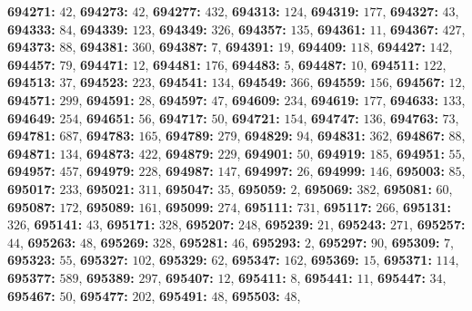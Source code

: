 \textsf{\bfseries 694271:} $42$, \textsf{\bfseries 694273:} $42$, \textsf{\bfseries 694277:} $432$, \textsf{\bfseries 694313:} $124$, \textsf{\bfseries 694319:} $177$, \textsf{\bfseries 694327:} $43$, \textsf{\bfseries 694333:} $84$, \textsf{\bfseries 694339:} $123$, \textsf{\bfseries 694349:} $326$, \textsf{\bfseries 694357:} $135$, \textsf{\bfseries 694361:} $11$, \textsf{\bfseries 694367:} $427$, \textsf{\bfseries 694373:} $88$, \textsf{\bfseries 694381:} $360$, \textsf{\bfseries 694387:} $7$, \textsf{\bfseries 694391:} $19$, \textsf{\bfseries 694409:} $118$, \textsf{\bfseries 694427:} $142$, \textsf{\bfseries 694457:} $79$, \textsf{\bfseries 694471:} $12$, \textsf{\bfseries 694481:} $176$, \textsf{\bfseries 694483:} $5$, \textsf{\bfseries 694487:} $10$, \textsf{\bfseries 694511:} $122$, \textsf{\bfseries 694513:} $37$, \textsf{\bfseries 694523:} $223$, \textsf{\bfseries 694541:} $134$, \textsf{\bfseries 694549:} $366$, \textsf{\bfseries 694559:} $156$, \textsf{\bfseries 694567:} $12$, \textsf{\bfseries 694571:} $299$, \textsf{\bfseries 694591:} $28$, \textsf{\bfseries 694597:} $47$, \textsf{\bfseries 694609:} $234$, \textsf{\bfseries 694619:} $177$, \textsf{\bfseries 694633:} $133$, \textsf{\bfseries 694649:} $254$, \textsf{\bfseries 694651:} $56$, \textsf{\bfseries 694717:} $50$, \textsf{\bfseries 694721:} $154$, \textsf{\bfseries 694747:} $136$, \textsf{\bfseries 694763:} $73$, \textsf{\bfseries 694781:} $687$, \textsf{\bfseries 694783:} $165$, \textsf{\bfseries 694789:} $279$, \textsf{\bfseries 694829:} $94$, \textsf{\bfseries 694831:} $362$, \textsf{\bfseries 694867:} $88$, \textsf{\bfseries 694871:} $134$, \textsf{\bfseries 694873:} $422$, \textsf{\bfseries 694879:} $229$, \textsf{\bfseries 694901:} $50$, \textsf{\bfseries 694919:} $185$, \textsf{\bfseries 694951:} $55$, \textsf{\bfseries 694957:} $457$, \textsf{\bfseries 694979:} $228$, \textsf{\bfseries 694987:} $147$, \textsf{\bfseries 694997:} $26$, \textsf{\bfseries 694999:} $146$, \textsf{\bfseries 695003:} $85$, \textsf{\bfseries 695017:} $233$, \textsf{\bfseries 695021:} $311$, \textsf{\bfseries 695047:} $35$, \textsf{\bfseries 695059:} $2$, \textsf{\bfseries 695069:} $382$, \textsf{\bfseries 695081:} $60$, \textsf{\bfseries 695087:} $172$, \textsf{\bfseries 695089:} $161$, \textsf{\bfseries 695099:} $274$, \textsf{\bfseries 695111:} $731$, \textsf{\bfseries 695117:} $266$, \textsf{\bfseries 695131:} $326$, \textsf{\bfseries 695141:} $43$, \textsf{\bfseries 695171:} $328$, \textsf{\bfseries 695207:} $248$, \textsf{\bfseries 695239:} $21$, \textsf{\bfseries 695243:} $271$, \textsf{\bfseries 695257:} $44$, \textsf{\bfseries 695263:} $48$, \textsf{\bfseries 695269:} $328$, \textsf{\bfseries 695281:} $46$, \textsf{\bfseries 695293:} $2$, \textsf{\bfseries 695297:} $90$, \textsf{\bfseries 695309:} $7$, \textsf{\bfseries 695323:} $55$, \textsf{\bfseries 695327:} $102$, \textsf{\bfseries 695329:} $62$, \textsf{\bfseries 695347:} $162$, \textsf{\bfseries 695369:} $15$, \textsf{\bfseries 695371:} $114$, \textsf{\bfseries 695377:} $589$, \textsf{\bfseries 695389:} $297$, \textsf{\bfseries 695407:} $12$, \textsf{\bfseries 695411:} $8$, \textsf{\bfseries 695441:} $11$, \textsf{\bfseries 695447:} $34$, \textsf{\bfseries 695467:} $50$, \textsf{\bfseries 695477:} $202$, \textsf{\bfseries 695491:} $48$, \textsf{\bfseries 695503:} $48$, 

